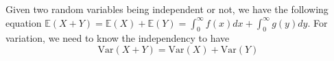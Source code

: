 \documentclass[preview,border=10pt]{standalone}
\newcommand{\E}{\mathbb{E}}
\newcommand{\Var}{\mathrm{Var}}
\begin{document}
    Given two random variables being independent or not, we have the following equation $\E(X+Y)=\E(X)+\E(Y)=\int_0^\infty f(x)dx+\int_0^\infty g(y)dy$. For variation, we need to know the independency to have
    \begin{displaymath}
       \Var(X+Y)=\Var(X)+\Var(Y) 
    \end{displaymath}
\end{document}
